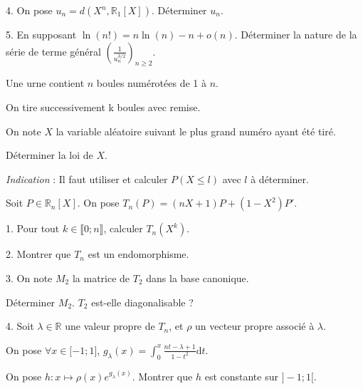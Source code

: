 \vspace{10pt}
4. On pose $u_n = d(X^n, \mathbb{R}_1[X])$. Déterminer $u_n$.

\vspace{10pt}
5. En supposant $\ln(n!) = n\ln(n) - n + o(n)$. Déterminer la nature de la série de terme général
$\displaystyle \left(\frac {1} {u_n^{3/2}}\right)_{n \geqslant 2}$.



\subetoiles



\noindent Une urne contient $n$ boules numérotées de 1 à $n$.

\noindent On tire successivement k boules avec remise.

\noindent On note $X$ la variable aléatoire suivant le plus grand numéro ayant été tiré.

\vspace{10pt}
Déterminer la loi de $X$.

\vspace{10pt}
\noindent \textit{Indication} : Il faut utiliser et calculer $P(X \leqslant l)$ avec $l$ à déterminer.



\subetoiles
\columnbreak



\noindent Soit $P \in \mathbb{R}_n[X]$. On pose $T_n(P) = (nX+1)P + (1-X^2)P'$.

\vspace{5pt}
1. Pour tout $k \in \llbracket 0;n \rrbracket$, calculer $T_n(X^k)$.

\vspace{5pt}
2. Montrer que $T_n$ est un endomorphisme.

\vspace{5pt}
3. On note $M_2$ la matrice de $T_2$ dans la base canonique.

Déterminer $M_2$. $T_2$ est-elle diagonalisable ?

\vspace{5pt}
4. Soit $\lambda \in \mathbb{R}$ une valeur propre de $T_n$, et $\rho$ un vecteur propre associé à $\lambda$.

\vspace{5pt}
On pose $\forall x \in \lbrack -1; 1 \rbrack$,
$\displaystyle g_{\lambda}(x) = \int_{0}^{x} \frac {n t - \lambda + 1} {1 - t^2} \mathrm{d}t$.

\vspace{5pt}
On pose $h : x \mapsto \rho(x)e^{g_{\lambda}(x)}$. Montrer que $h$ est constante sur $\rbrack -1;1 \lbrack$.

